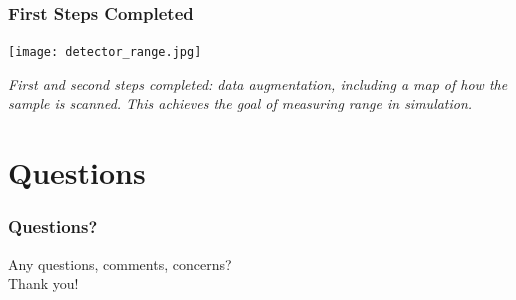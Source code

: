 \documentclass[notheorems,11pt,compress]{beamer}
\begin{document}
\begin{frame}
\frametitle{First Steps Completed}
\begin{center}
\texttt{[image: detector\_range.jpg]}
\end{center}
\small
\textit{First and second steps completed: data augmentation, including a map of how the sample is scanned. This achieves the goal of measuring range in simulation.}
\end{frame}

\section*{Questions}

\begin{frame}
\frametitle{Questions?}
\begin{center}
\LARGE{Any questions, comments, concerns?}\\[2em]
\Huge{\textcolor[RGB]{255,0,0}{Thank you!}}
\end{center}
\end{frame}
\end{document}
